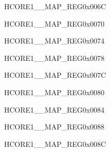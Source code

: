 \begin{register}{H}{CORE1\_\_MAP\_REG}{0x006C}\label{regdesc:CORE1I2S0INTMAPREG}
\end{register}\vspace{-3em}


\begin{register}{H}{CORE1\_\_MAP\_REG}{0x0070}\label{regdesc:CORE1I2S1INTMAPREG}
\end{register}\vspace{-3em}


\begin{register}{H}{CORE1\_\_MAP\_REG}{0x0074}\label{regdesc:CORE1I2S2INTMAPREG}
\end{register}\vspace{-3em}


\begin{register}{H}{CORE1\_\_MAP\_REG}{0x0078}\label{regdesc:CORE1UHCI0INTMAPREG}
\end{register}\vspace{-3em}


\begin{register}{H}{CORE1\_\_MAP\_REG}{0x007C}\label{regdesc:CORE1UART0INTMAPREG}
\end{register}\vspace{-3em}


\begin{register}{H}{CORE1\_\_MAP\_REG}{0x0080}\label{regdesc:CORE1UART1INTMAPREG}
\end{register}\vspace{-3em}


\begin{register}{H}{CORE1\_\_MAP\_REG}{0x0084}\label{regdesc:CORE1UART2INTMAPREG}
\end{register}\vspace{-3em}


\begin{register}{H}{CORE1\_\_MAP\_REG}{0x0088}\label{regdesc:CORE1UART3INTMAPREG}
\end{register}\vspace{-3em}


\begin{register}{H}{CORE1\_\_MAP\_REG}{0x008C}\label{regdesc:CORE1UART4INTMAPREG}
\end{register}\vspace{-3em}


